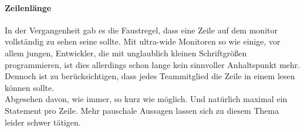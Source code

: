        \paragraph{Zeilenlänge}
            In der Vergangenheit gab es die Faustregel, dass eine Zeile auf dem monitor vollständig zu sehen seine sollte.
            Mit ultra-wide Monitoren so wie einige, vor allem jungen, Entwickler, die mit unglaublich kleinen Schriftgrößen programmieren, ist dies allerdings schon lange kein sinnvoller Anhaltspunkt mehr.
            Dennoch ist zu berücksichtigen, dass jedes Teammitglied die Zeile in einem lesen können sollte.\\
            Abgesehen davon, wie immer, so kurz wie möglich.
            Und natürlich maximal ein Statement pro Zeile.
            Mehr pauschale Aussagen lassen sich zu diesem Thema leider schwer tätigen.


